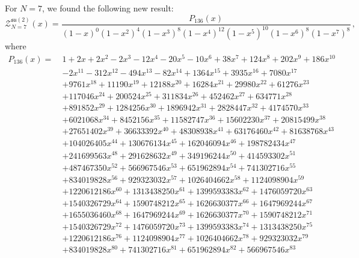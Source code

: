 \documentclass[a4paper,11pt]{article}
\begin{document}
For $N=7$, we found the following new result:
\begin{equation}
	\mathcal{Z}^{\mathfrak{su}(2)}_{N=7}(x) = \frac{P_{136}(x)}{(1-x)^0(1-x^2)^4(1-x^3)^8(1-x^4)^{12}(1-x^5)^{10}(1-x^6)^8(1-x^7)^8} \,,
\end{equation}
where
\begingroup
\allowdisplaybreaks
\begin{align}
	P_{136}(x)=\ &1+2 x+2 x^2-2 x^3-12 x^4-20 x^5-10 x^6+38 x^7+124 x^8+202 x^9+186 x^{10}\nonumber\\
	&-2 x^{11}-312 x^{12}-494 x^{13}-82 x^{14}+1364 x^{15}+3935 x^{16}+7080 x^{17}\nonumber\\
	&+9761x^{18}+11190 x^{19}+12188 x^{20}+16284 x^{21}+29980 x^{22}+61276 x^{23}\nonumber\\
	&+117046 x^{24}+200524 x^{25}+311834 x^{26}+452462 x^{27}+634771 x^{28}\nonumber\\
	&+891852 x^{29}+1284256 x^{30}+1896942 x^{31}+2828447 x^{32}+4174570 x^{33}\nonumber\\
	&+6021068 x^{34}+8452156 x^{35}+11582747 x^{36}+15602230 x^{37}+20815499 x^{38}\nonumber\\
	&+27651402x^{39}+36633392 x^{40}+48308938 x^{41}+63176460 x^{42}+81638768 x^{43}\nonumber\\
	&+104026405 x^{44}+130676134 x^{45}+162046094 x^{46}+198782434 x^{47}\nonumber\\
	&+241699563 x^{48}+291628632 x^{49}+349196244 x^{50}+414593302 x^{51}\nonumber\\
	&+487467350 x^{52}+566967546 x^{53}+651962894 x^{54}+741302716 x^{55}\nonumber\\
	&+834019828 x^{56}+929323032x^{57}+1026404662 x^{58}+1124098904 x^{59}\nonumber\\
	&+1220612186 x^{60}+1313438250 x^{61}+1399593383 x^{62}+1476059720 x^{63}\nonumber\\
	&+1540326729 x^{64}+1590748212 x^{65}+1626630377x^{66}+1647969244 x^{67}\nonumber\\
	&+1655036460 x^{68}+1647969244 x^{69}+1626630377 x^{70}+1590748212 x^{71}\nonumber\\
	&+1540326729 x^{72}+1476059720 x^{73}+1399593383 x^{74}+1313438250x^{75}\nonumber\\
	&+1220612186 x^{76}+1124098904 x^{77}+1026404662 x^{78}+929323032 x^{79}\nonumber\\
	&+834019828 x^{80}+741302716 x^{81}+651962894 x^{82}+566967546 x^{83}\nonumber\\

\end{align}
\end{document}
